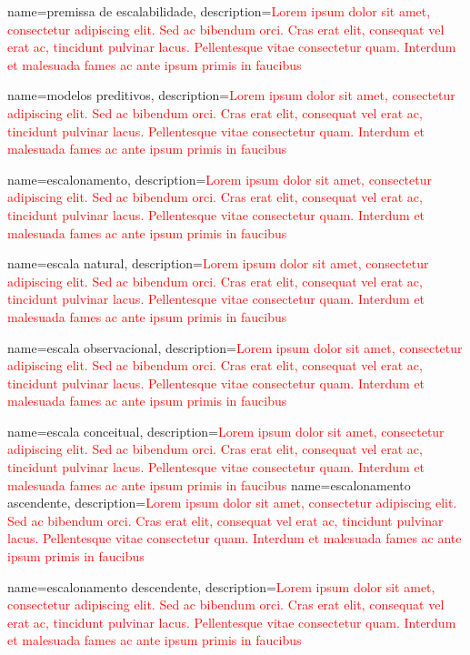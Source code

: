 {
	name=premissa de escalabilidade,
	description={\textcolor{red}{Lorem ipsum dolor sit amet, consectetur adipiscing elit. Sed ac bibendum orci. Cras erat elit, consequat vel erat ac, tincidunt pulvinar lacus. Pellentesque vitae consectetur quam. Interdum et malesuada fames ac ante ipsum primis in faucibus}}
}

{
	name=modelos preditivos,
	description={\textcolor{red}{Lorem ipsum dolor sit amet, consectetur adipiscing elit. Sed ac bibendum orci. Cras erat elit, consequat vel erat ac, tincidunt pulvinar lacus. Pellentesque vitae consectetur quam. Interdum et malesuada fames ac ante ipsum primis in faucibus}}
}

{
	name=escalonamento,
	description={\textcolor{red}{Lorem ipsum dolor sit amet, consectetur adipiscing elit. Sed ac bibendum orci. Cras erat elit, consequat vel erat ac, tincidunt pulvinar lacus. Pellentesque vitae consectetur quam. Interdum et malesuada fames ac ante ipsum primis in faucibus}}
}

{
	name=escala natural,
	description={\textcolor{red}{Lorem ipsum dolor sit amet, consectetur adipiscing elit. Sed ac bibendum orci. Cras erat elit, consequat vel erat ac, tincidunt pulvinar lacus. Pellentesque vitae consectetur quam. Interdum et malesuada fames ac ante ipsum primis in faucibus}}
}

{
	name=escala observacional,
	description={\textcolor{red}{Lorem ipsum dolor sit amet, consectetur adipiscing elit. Sed ac bibendum orci. Cras erat elit, consequat vel erat ac, tincidunt pulvinar lacus. Pellentesque vitae consectetur quam. Interdum et malesuada fames ac ante ipsum primis in faucibus}}
}

{
	name=escala conceitual,
	description={\textcolor{red}{Lorem ipsum dolor sit amet, consectetur adipiscing elit. Sed ac bibendum orci. Cras erat elit, consequat vel erat ac, tincidunt pulvinar lacus. Pellentesque vitae consectetur quam. Interdum et malesuada fames ac ante ipsum primis in faucibus}}
}
{
	name=escalonamento ascendente,
	description={\textcolor{red}{Lorem ipsum dolor sit amet, consectetur adipiscing elit. Sed ac bibendum orci. Cras erat elit, consequat vel erat ac, tincidunt pulvinar lacus. Pellentesque vitae consectetur quam. Interdum et malesuada fames ac ante ipsum primis in faucibus}}
}

{
	name=escalonamento descendente,
	description={\textcolor{red}{Lorem ipsum dolor sit amet, consectetur adipiscing elit. Sed ac bibendum orci. Cras erat elit, consequat vel erat ac, tincidunt pulvinar lacus. Pellentesque vitae consectetur quam. Interdum et malesuada fames ac ante ipsum primis in faucibus}}
}

